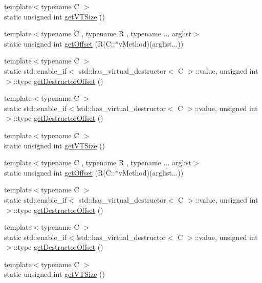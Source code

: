 \begin{DoxyCompactItemize}
\item 
{\footnotesize template$<$typename C $>$ }\\static unsigned int \mbox{\hyperlink{classfakeit_1_1VTUtils_a54ddc7bb539671fbf957920f051a6104}{get\+V\+T\+Size}} ()
\item 
{\footnotesize template$<$typename C , typename R , typename ... arglist$>$ }\\static unsigned int \mbox{\hyperlink{classfakeit_1_1VTUtils_a0e019646d770355889228b1d88675530}{get\+Offset}} (R(C\+::$\ast$v\+Method)(arglist...))
\item 
{\footnotesize template$<$typename C $>$ }\\static std\+::enable\+\_\+if$<$ std\+::has\+\_\+virtual\+\_\+destructor$<$ C $>$\+::value, unsigned int $>$\+::type \mbox{\hyperlink{classfakeit_1_1VTUtils_a9c71030f6040b59ec03cbe326ae1d654}{get\+Destructor\+Offset}} ()
\item 
{\footnotesize template$<$typename C $>$ }\\static std\+::enable\+\_\+if$<$!std\+::has\+\_\+virtual\+\_\+destructor$<$ C $>$\+::value, unsigned int $>$\+::type \mbox{\hyperlink{classfakeit_1_1VTUtils_ac13eea89df8b1656a1bedb9a9bb5c518}{get\+Destructor\+Offset}} ()
\item 
{\footnotesize template$<$typename C $>$ }\\static unsigned int \mbox{\hyperlink{classfakeit_1_1VTUtils_a54ddc7bb539671fbf957920f051a6104}{get\+V\+T\+Size}} ()
\item 
{\footnotesize template$<$typename C , typename R , typename ... arglist$>$ }\\static unsigned int \mbox{\hyperlink{classfakeit_1_1VTUtils_a0e019646d770355889228b1d88675530}{get\+Offset}} (R(C\+::$\ast$v\+Method)(arglist...))
\item 
{\footnotesize template$<$typename C $>$ }\\static std\+::enable\+\_\+if$<$ std\+::has\+\_\+virtual\+\_\+destructor$<$ C $>$\+::value, unsigned int $>$\+::type \mbox{\hyperlink{classfakeit_1_1VTUtils_a9c71030f6040b59ec03cbe326ae1d654}{get\+Destructor\+Offset}} ()
\item 
{\footnotesize template$<$typename C $>$ }\\static std\+::enable\+\_\+if$<$!std\+::has\+\_\+virtual\+\_\+destructor$<$ C $>$\+::value, unsigned int $>$\+::type \mbox{\hyperlink{classfakeit_1_1VTUtils_ac13eea89df8b1656a1bedb9a9bb5c518}{get\+Destructor\+Offset}} ()
\item 
{\footnotesize template$<$typename C $>$ }\\static unsigned int \mbox{\hyperlink{classfakeit_1_1VTUtils_a54ddc7bb539671fbf957920f051a6104}{get\+V\+T\+Size}} ()

\end{DoxyCompactItemize}
